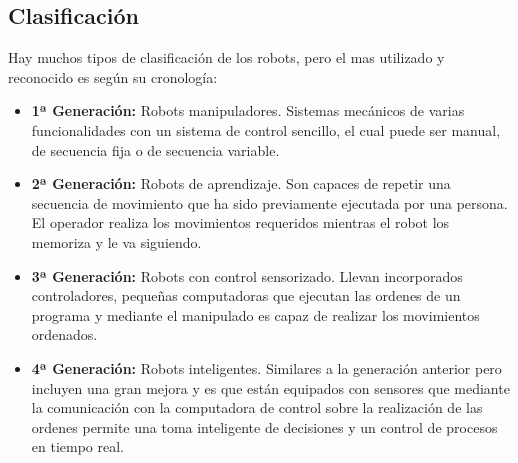 \subsection{Clasificación}
\hspace{1cm} Hay muchos tipos de clasificación de los robots, pero el mas utilizado y reconocido es según su cronología:

\begin{itemize}
		\item \textbf{1ª Generación:} Robots manipuladores. Sistemas mecánicos de varias funcionalidades con un sistema de control sencillo, el cual puede ser manual, de secuencia fija o de secuencia variable.

	\item\textbf{2ª Generación:} Robots de aprendizaje. Son capaces de repetir una secuencia de movimiento que ha sido previamente ejecutada por una persona. El operador realiza los movimientos requeridos mientras el robot los memoriza y le va siguiendo. 

	\item\textbf{3ª Generación:} Robots con control sensorizado. Llevan incorporados controladores, pequeñas computadoras que ejecutan las ordenes de un programa y mediante el manipulado es capaz de realizar los movimientos ordenados.

	\item\textbf{4ª Generación:} Robots inteligentes. Similares a la generación anterior pero incluyen una gran mejora y es que están equipados con sensores que mediante la comunicación con la computadora de control sobre la realización de las ordenes permite una toma inteligente de decisiones y un control de procesos en tiempo real.
\end{itemize}

